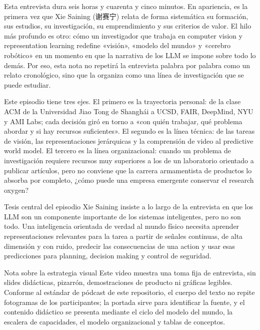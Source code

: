 \documentclass[a4paper]{article}
\begin{document}
Esta entrevista dura seis horas y cuarenta y cinco minutos. En apariencia, es la primera vez que Xie Saining (谢赛宁) relata de forma sistemática su formación, sus estudios, su investigación, su emprendimiento y sus criterios de valor. El hilo más profundo es otro: cómo un investigador que trabaja en computer vision y representation learning redefine «visión», «modelo del mundo» y «cerebro robótico» en un momento en que la narrativa de los LLM se impone sobre todo lo demás. Por eso, esta nota no repetirá la entrevista palabra por palabra como un relato cronológico, sino que la organiza como una línea de investigación que se puede estudiar.

Este episodio tiene tres ejes. El primero es la trayectoria personal: de la clase ACM de la Universidad Jiao Tong de Shanghái a UCSD, FAIR, DeepMind, NYU y AMI Labs; cada decisión giró en torno a «con quién trabajar, qué problema abordar y si hay recursos suficientes». El segundo es la línea técnica: de las tareas de visión, las representaciones jerárquicas y la comprensión de video al predictive world model. El tercero es la línea organizacional: cuando un problema de investigación requiere recursos muy superiores a los de un laboratorio orientado a publicar artículos, pero no conviene que la carrera armamentista de productos lo absorba por completo, ¿cómo puede una empresa emergente conservar el research oxygen?

\begin{importantbox}{Tesis central del episodio}
Xie Saining insiste a lo largo de la entrevista en que los LLM son un componente importante de los sistemas inteligentes, pero no son todo. Una inteligencia orientada de verdad al mundo físico necesita aprender representaciones relevantes para la tarea a partir de señales continuas, de alta dimensión y con ruido, predecir las consecuencias de una action y usar esas predicciones para planning, decision making y control de seguridad.
\end{importantbox}

\begin{knowledgebox}{Nota sobre la estrategia visual}
Este video muestra una toma fija de entrevista, sin slides didácticas, pizarrón, demostraciones de producto ni gráficas legibles. Conforme al estándar de pódcast de este repositorio, el cuerpo del texto no repite fotogramas de los participantes; la portada sirve para identificar la fuente, y el contenido didáctico se presenta mediante el ciclo del modelo del mundo, la escalera de capacidades, el modelo organizacional y tablas de conceptos.
\end{knowledgebox}
\end{document}
